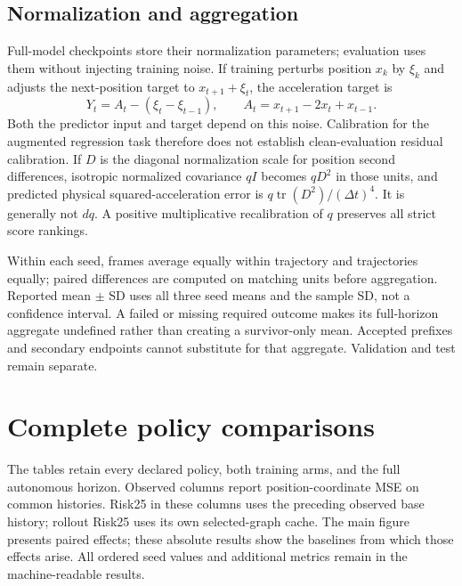 \subsection{Normalization and aggregation}
\label{sec:noise-augmentation}
Full-model checkpoints store their normalization parameters; evaluation uses them without injecting training noise. If training perturbs position $x_k$ by $\xi_k$ and adjusts the next-position target to $x_{t+1}+\xi_t$, the acceleration target is
\begin{equation}
 Y_t=A_t-(\xi_t-\xi_{t-1}),\qquad A_t=x_{t+1}-2x_t+x_{t-1}.
 \label{eq:noise-target-identity}
\end{equation}
Both the predictor input and target depend on this noise. Calibration for the augmented regression task therefore does not establish clean-evaluation residual calibration. If $D$ is the diagonal normalization scale for position second differences, isotropic normalized covariance $qI$ becomes $qD^2$ in those units, and predicted physical squared-acceleration error is $q\operatorname{tr}(D^2)/(\Delta t)^4$. It is generally not $dq$. A positive multiplicative recalibration of $q$ preserves all strict score rankings.

Within each seed, frames average equally within trajectory and trajectories equally; paired differences are computed on matching units before aggregation. Reported mean $\pm$ SD uses all three seed means and the sample SD, not a confidence interval. A failed or missing required outcome makes its full-horizon aggregate undefined rather than creating a survivor-only mean. Accepted prefixes and secondary endpoints cannot substitute for that aggregate. Validation and test remain separate.

\section{Complete policy comparisons}
The tables retain every declared policy, both training arms, and the full autonomous horizon. Observed columns report position-coordinate MSE on common histories. Risk25 in these columns uses the preceding observed base history; rollout Risk25 uses its own selected-graph cache. The main figure presents paired effects; these absolute results show the baselines from which those effects arise. All ordered seed values and additional metrics remain in the machine-readable results.

